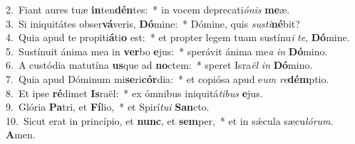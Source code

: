 {2.~}Fiant aures tuæ \textbf{in}ten\textbf{dén}tes:~* in vocem deprecati\textit{ó}\textit{nis} \textbf{me}æ.\\
{3.~}Si iniquitátes obser\textbf{vá}veris, \textbf{Dó}mine:~* Dómine, quis \textit{su}\textit{sti}\textbf{né}bit?\\
{4.~}Quia apud te propiti\textbf{á}ti\textbf{o} est:~* et propter legem tuam sustínu\textit{i} \textit{te}, \textbf{Dó}mine.\\
{5.~}Sustínuit ánima mea in \textbf{ver}bo \textbf{e}jus:~* sperávit ánima me\textit{a} \textit{in} \textbf{Dó}mino.\\
{6.~}A custódia matutína \textbf{us}que ad \textbf{no}ctem:~* speret Isra\textit{ël} \textit{in} \textbf{Dó}mino.\\
{7.~}Quia apud Dóminum mi\textbf{se}ri\textbf{cór}dia:~* et copiósa apud e\textit{um} \textit{re}\textbf{dém}ptio.\\
{8.~}Et ipse \textbf{ré}dimet \textbf{Is}raël:~* ex ómnibus iniquitá\textit{ti}\textit{bus} \textbf{e}jus.\\
{9.~}Glória \textbf{Pa}tri, et \textbf{Fí}lio,~* et Spirí\textit{tu}\textit{i} \textbf{San}cto.\\
{10.~}Sicut erat in princípio, et \textbf{nunc}, et \textbf{sem}per,~* et in sǽcula sæcu\textit{ló}\textit{rum}. \textbf{A}men.\\
